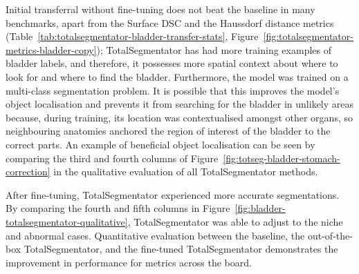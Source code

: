 \documentclass[11pt,twoside]{report}
\begin{document}
Initial transferral without fine-tuning does not beat the baseline in many benchmarks, apart from the Surface DSC and the Haussdorf distance metrics (Table~\ref{tab:totalsegmentator-bladder-transfer-stats}, Figure~\ref{fig:totalsegmentator-metrics-bladder-copy}); TotalSegmentator has had more training examples of bladder labels, and therefore, it possesses more spatial context about where to look for and where to find the bladder. Furthermore, the model was trained on a multi-class segmentation problem. It is possible that this improves the model's object localisation and prevents it from searching for the bladder in unlikely areas because, during training, its location was contextualised amongst other organs, so neighbouring anatomies anchored the region of interest of the bladder to the correct parts. An example of beneficial object localisation can be seen by comparing the third and fourth columns of Figure~\ref{fig:totseg-bladder-stomach-correction} in the qualitative evaluation of all TotalSegmentator methods.

After fine-tuning, TotalSegmentator experienced more accurate segmentations. By comparing the fourth and fifth columns in Figure~\ref{fig:bladder-totalsegmentator-qualitative}, TotalSegmentator was able to adjust to the niche and abnormal cases. Quantitative evaluation between the baseline, the out-of-the-box TotalSegmentator, and the fine-tuned TotalSegmentator demonstrates the improvement in performance for metrics across the board.
\end{document}
